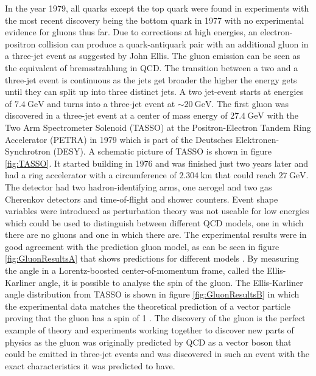 In the year 1979, all quarks except the top quark were found in experiments with the most recent discovery being the bottom quark in 1977 with no experimental evidence for gluons thus far.
Due to corrections at high energies, an electron-positron collision can produce a quark-antiquark pair with an additional gluon in a three-jet event as suggested by John Ellis.
The gluon emission can be seen as the equivalent of bremsstrahlung in QCD.
The transition between a two and a three-jet event is continuous as the jets get broader the higher the energy gets until they can split up into three distinct jets.
A two jet-event starts at energies of $\SI{7.4}{\giga\eV}$ and turns into a three-jet event at $\sim\SI{20}{\giga\eV}$.
The first gluon was discovered in a three-jet event at a center of mass energy of $\SI{27.4}{\giga\eV}$ with the Two Arm Spectrometer Solenoid (TASSO) at the Positron-Electron Tandem Ring Accelerator (PETRA) in 1979 which is part of the Deutsches Elektronen-Synchrotron (DESY).
A schematic picture of TASSO is shown in figure \ref{fig:TASSO}.
It started building in 1976 and was finished just two years later and had a ring accelerator with a circumference of $\SI{2.304}{\kilo\meter}$ that could reach $\SI{27}{\giga\eV}$.
The detector had two hadron-identifying arms, one aerogel and two gas Cherenkov detectors and time-of-flight and shower counters.
Event shape variables were introduced as perturbation theory was not useable for low energies which could be used to distinguish between different QCD models, one in which there are no gluons and one in which there are.
The experimental results were in good agreement with the prediction gluon model, as can be seen in figure \ref{fig:GluonResultsA} that shows predictions for different models \cite{Branson:1994eu}.
By measuring the angle in a Lorentz-boosted center-of-momentum frame, called the Ellis-Karliner angle, it is possible to analyse the spin of the gluon.
The Ellis-Karliner angle distribution from TASSO is shown in figure \ref{fig:GluonResultsB} in which the experimental data matches the theoretical prediction of a vector particle proving that the gluon has a spin of 1 \cite{Venker, Soding:1996zk}.
The discovery of the gluon is the perfect example of theory and experiments working together to discover new parts of physics as the gluon was originally predicted by QCD as a vector boson that could be emitted in three-jet events and was discovered in such an event with the exact characteristics it was predicted to have.

